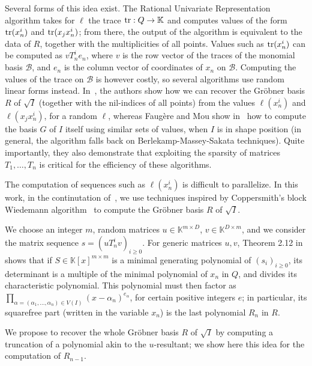 \documentclass[12pt]{article}
\begin{document}
Several forms of this idea exist. The Rational Univariate
Representation algorithm takes for $\ell$ the trace ${\rm tr}: Q \to
\mathbb{K}$ and computes values of the form ${\rm tr}(x_n^i)$ and
${\rm tr}(x_j x_n^i)$; from there, the output of the algorithm is
equivalent to the data of $R$, together with the multiplicities of all
points. Values such as ${\rm tr}(x_n^i)$ can be computed as $v T_n^i
e_n$, where $v$ is the row vector of the traces of the monomial basis
$\mathscr{B}$, and $e_n$ is the column vector of coordinates of $x_n$ on
$\mathscr{B}$. Computing the values of the trace on $\mathscr{B}$ is
however costly, so several algorithms use random linear forms
instead. In~\cite{BoSaSc03}, the authors show how we can recover the
Gr\"obner basis $R$ of $\sqrt{I}$ (together with the nil-indices of
all points) from the values $\ell(x_n^i)$ and $\ell(x_j x_n^i)$, for a
random $\ell$, whereas Faug\`ere and Mou show in~\cite{FaMo17} how to
compute the basis $G$ of $I$ itself using similar sets of values, when
$I$ is in shape position (in general, the algorithm falls back on
Berlekamp-Massey-Sakata techniques). Quite importantly, they also
demonstrate that exploiting the sparsity of matrices $T_1,\dots,T_n$
is critical for the efficiency of these algorithms.

The computation of sequences such as $\ell(x_n^i)$ is difficult to
parallelize.  In this work, in the continutation of~\cite{BoSaSc03},
we use techniques inspired by Coppersmith's block Wiedemann
algorithm~\cite{Coppersmith93} to compute the Gr\"obner basis $R$ of
$\sqrt{I}$.

 We choose an integer $m$, random
matrices $u \in \mathbb{K}^{m \times D}$, $v \in \mathbb{K}^{D \times
  m}$, and we consider the matrix sequence $s = (uT_n^iv)_{i \ge
  0}$. For generic matrices $u, v$, Theorem 2.12 in~\cite{KaVi04}
shows that if $S \in \mathbb{K}[x]^{m\times m}$ is a minimal
generating polynomial of $(s_i)_{i \ge 0}$, its determinant is a
multiple of the minimal polynomial of $x_n$ in $Q$, and divides its
characteristic polynomial. This polynomial must then factor as
$\prod_{\alpha=(\alpha_1,\dots,\alpha_n) \in V(I)}
(x-\alpha_n)^{e_\alpha}$, for certain positive integers $e$; in
particular, its squarefree part (written in the variable $x_n$) is the last polynomial $R_n$ in $R$.

\medskip{} We propose  to recover the 
whole Gr\"obner basis $R$ of $\sqrt{I}$ by computing a truncation of
a polynomial akin to the $u$-resultant; we show here this idea for the computation
of $R_{n-1}$.
\end{document}

